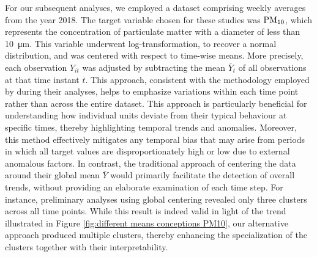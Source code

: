 \documentclass[12pt,	%
	a4paper,		%
	twoside,		%
	openright,		%
	titlepage,%
	]{book}
\theoremstyle{definition}
\let\cite\citep
\begin{document}
For our subsequent analyses, we employed a dataset comprising weekly averages from the year 2018. The target variable chosen for these studies was $\text{PM}_{10}$, which represents the concentration of particulate matter with a diameter of less than \SI{10}{\micro\metre}. This variable underwent log-transformation, to recover a normal distribution, and was centered with respect to time-wise means. More precisely, each observation $Y_{it}$ was adjusted by subtracting the mean $\bar{Y}_t$ of all observations at that time instant $t$. This approach, consistent with the methodology employed by \cite{1-drpm} during their analyses, helps to emphasize variations within each time point rather than across the entire dataset. This approach is particularly beneficial for understanding how individual units deviate from their typical behaviour at specific times, thereby highlighting temporal trends and anomalies. Moreover, this method effectively mitigates any temporal bias that may arise from periods in which all target values are disproportionately high or low due to external anomalous factors. In contrast, the traditional approach of centering the data around their global mean $\bar{Y}$ would primarily facilitate the detection of overall trends, without providing an elaborate examination of each time step. For instance, preliminary analyses using global centering revealed only three clusters across all time points. While this result is indeed valid in light of the trend illustrated in Figure \ref{fig:different means conceptions PM10}, our alternative approach produced multiple clusters, thereby enhancing the specialization of the clusters together with their interpretability.
\end{document}
